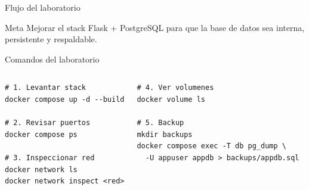\documentclass[aspectratio=169]{beamer}
\begin{document}
\begin{frame}{Flujo del laboratorio}
  \begin{center}
  \end{center}
  \begin{block}{Meta}
    Mejorar el stack Flask + PostgreSQL para que la base de datos sea interna, persistente y respaldable.
  \end{block}
\end{frame}

\begin{frame}[fragile]{Comandos del laboratorio}
  \footnotesize
  \begin{columns}[T]
\begin{lstlisting}[style=terminal]
# 1. Levantar stack
docker compose up -d --build

# 2. Revisar puertos
docker compose ps

# 3. Inspeccionar red
docker network ls
docker network inspect <red>
\end{lstlisting}
\begin{lstlisting}[style=terminal]
# 4. Ver volumenes
docker volume ls

# 5. Backup
mkdir backups
docker compose exec -T db pg_dump \
  -U appuser appdb > backups/appdb.sql
\end{lstlisting}
  \end{columns}
\end{frame}
\end{document}
